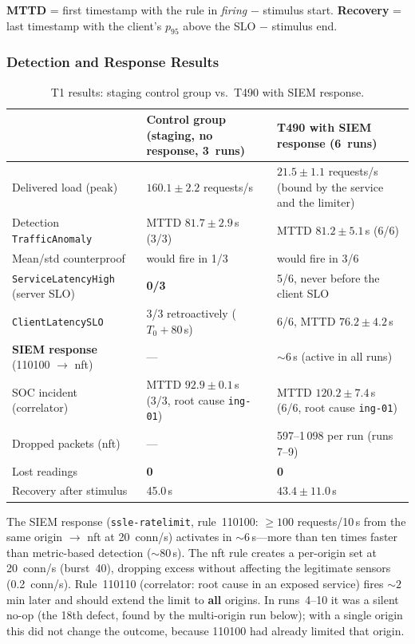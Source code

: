 \documentclass[11pt,a4paper]{article}
\begin{document}
\textbf{MTTD} = first timestamp with the rule in \emph{firing} $-$ stimulus start.
\textbf{Recovery} = last timestamp with the client's $p_{95}$ above the SLO $-$ stimulus end.

\subsubsection{Detection and Response Results}

\begin{table}[H]
  \centering
  \caption{T1 results: staging control group vs.\ T490 with SIEM response.}
  \label{tab:t1-results}
  \small
  \begin{tabular}{@{}p{2.8cm}p{4.8cm}p{4.8cm}@{}}
    \toprule
    & \textbf{Control group} (staging, no response, 3~runs) &
      \textbf{T490 with SIEM response} (6~runs) \\
    \midrule
    Delivered load (peak) &
      $160.1 \pm 2.2$ requests/s &
      $21.5 \pm 1.1$ requests/s (bound by the service and the limiter) \\
    Detection \texttt{Traffic\-Anomaly} &
      MTTD $81.7 \pm 2.9$\,s (3/3) &
      MTTD $81.2 \pm 5.1$\,s (6/6) \\
    Mean/std counterproof &
      would fire in 1/3 & would fire in 3/6 \\
    \texttt{Service\-Latency\-High} (server SLO) &
      \textbf{0/3} & 5/6, never before the client SLO \\
    \texttt{Client\-Latency\-SLO} &
      3/3 retroactively ($T_0 + 80$\,s) & 6/6, MTTD $76.2 \pm 4.2$\,s \\
    \textbf{SIEM response} (110100 $\to$ nft) &
      --- & ${\sim}6$\,s (active in all runs) \\
    SOC incident (correlator) &
      MTTD $92.9 \pm 0.1$\,s (3/3, root cause \texttt{ing-01}) &
      MTTD $120.2 \pm 7.4$\,s (6/6, root cause \texttt{ing-01}) \\
    Dropped packets (nft) &
      --- & 597--1\,098 per run (runs 7--9) \\
    Lost readings &
      \textbf{0} & \textbf{0} \\
    Recovery after stimulus &
      45.0\,s & $43.4 \pm 11.0$\,s \\
    \bottomrule
  \end{tabular}
\end{table}

The SIEM response (\texttt{ssle-ratelimit}, rule~110100: $\geq 100$ requests/10\,s from the
same origin $\to$ nft at 20~conn/s) activates in ${\sim}6$\,s---more than ten times faster
than metric-based detection (${\sim}80$\,s). The nft rule creates a per-origin set at
20~conn/s (burst~40), dropping excess without affecting the legitimate sensors
(0.2~conn/s). Rule~110110 (correlator: root cause in an exposed service) fires ${\sim}2$\,min
later and should extend the limit to \textbf{all} origins. In runs~4--10 it was a silent no-op
(the 18th defect, found by the multi-origin run below); with a single origin this did not change
the outcome, because 110100 had already limited that origin.
\end{document}
